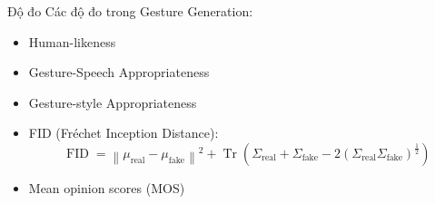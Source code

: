 

\begin{frame}{Độ đo}
	Các độ đo trong Gesture Generation:
	\begin{itemize}
		\item Human-likeness 
		\item Gesture-Speech Appropriateness
		\item Gesture-style Appropriateness
	\item {FID (Fréchet Inception Distance)}:
	\begin{equation*}
		\operatorname{FID} = \left\| \mu_{\operatorname{real}} - \mu_{\operatorname{fake}} \right\|^2 + \operatorname{Tr} \left( \Sigma_{\operatorname{real}} + \Sigma_{\operatorname{fake}} - 2 \left( \Sigma_{\operatorname{real}} \Sigma_{\operatorname{fake}} \right)^{\frac{1}{2}} \right)
	\end{equation*}
	 \item Mean opinion scores (MOS)
	
\end{itemize}
\end{frame}
